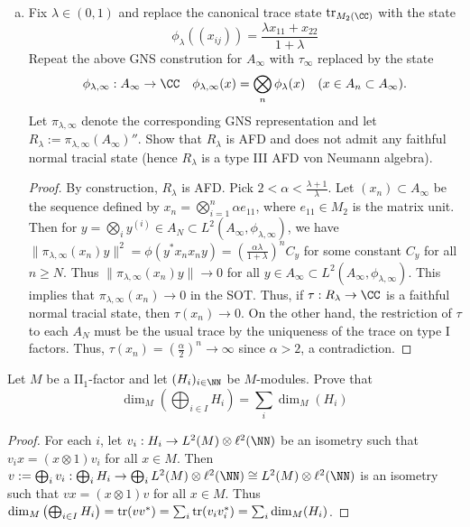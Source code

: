 \documentclass{article}
\begin{document}
\begin{enumerate}[(a)]
\item Fix $\lambda \in (0,1)$ and replace the canonical trace state $\Tr_{M_2(\CC)}$ with the state
  $$ \phi_\lambda((x_{ij})) = \frac{\lambda x_{11} + x_{22}}{1 + \lambda} $$
  Repeat the above GNS constrution for $A_\infty$ with $\tau_\infty$ replaced by
  the state
  $$\phi_{\lambda,\infty}:A_\infty \to \CC \quad \phi_{\lambda,\infty}(x) = \bigotimes_n\phi_\lambda(x) \quad (x \in A_n \subset A_\infty).$$
  Let $\pi_{\lambda,\infty}$ denote the corresponding GNS representation and
  let $R_\lambda := \pi_{\lambda, \infty}(A_\infty)''$.
  Show that $R_\lambda$ is AFD and does not admit any faithful normal tracial state (hence $R_\lambda$ is a type III AFD von Neumann algebra).
  \begin{proof}
    By construction, $R_\lambda$ is AFD.  Pick $2 < \alpha < \frac{\lambda + 1}{\lambda}$.  Let $(x_n) \subset A_\infty$ be the sequence defined by $x_n = \bigotimes_{i=1}^n \alpha e_{11}$, where $e_{11} \in M_2$ is the matrix unit.  Then for $y = \bigotimes_i y^{(i)} \in A_N \subset L^2(A_\infty, \phi_{\lambda, \infty})$, we have $\|\pi_{\lambda,\infty} (x_n) y \|^2  = \phi(y^* x_n x_n y) = \left( \frac{\alpha \lambda}{1 + \lambda} \right)^n C_y$ for some constant $C_y$ for all $n \ge N$. Thus $\|\pi_{\lambda,\infty} (x_n) y\| \to 0$ for all $y \in A_\infty \subset L^2(A_\infty, \phi_{\lambda, \infty})$. This implies that $\pi_{\lambda, \infty}(x_n) \to 0$ in the SOT.  Thus, if $\tau: R_\lambda \to \CC$ is a faithful normal tracial state, then $\tau(x_n) \to 0$. On the other hand, the restriction of $\tau$ to each $A_N$ must be the usual trace by the uniqueness of the trace on type I factors.  Thus, $\tau(x_n) = \left( \frac{\alpha}{2} \right)^n \to \infty$ since $\alpha > 2$, a contradiction.
  \end{proof}
\end{enumerate}

 Let $M$ be a II$_1$-factor and let $(H_i)_{i \in \NN}$ be $M$-modules. Prove that
$$\dim_M \left( \bigoplus_{i\in I} H_i \right) = \sum_i \dim_M(H_i)$$
\begin{proof}
  For each $i$, let $v_i: H_i \to L^2(M) \otimes \ell^2(\NN)$ be an isometry such that $v_i x = (x \otimes 1) v_i$ for all $x \in M$. Then
  $v := \bigoplus_i v_i: \bigoplus_i H_i \to \bigoplus_i L^2(M) \otimes \ell^2(\NN) \cong L^2(M) \otimes \ell^2(\NN)$ is an isometry such that
  $v x = (x \otimes 1) v$ for all $x \in M$.  Thus
  $\dim_M \left( \bigoplus_{i\in I} H_i \right) = \operatorname{tr}(v v^*) = \sum_i \operatorname{tr}(v_i v_i^*) = \sum_i \dim_M(H_i)$.
\end{proof}
\end{document}
